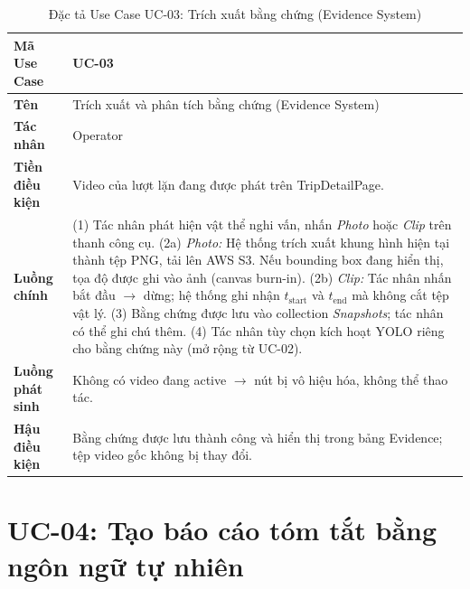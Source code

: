 \documentclass[../DoAn.tex]{subfiles}
\begin{document}
\begin{longtable}{|p{3.5cm}|p{10.0cm}|}
\caption{Đặc tả Use Case UC-03: Trích xuất bằng chứng (Evidence System)}\label{tab:b-uc03}\\
\hline
\textbf{Mã Use Case} & UC-03 \\
\hline
\textbf{Tên} & Trích xuất và phân tích bằng chứng (Evidence System) \\
\hline
\textbf{Tác nhân} & Operator \\
\hline
\textbf{Tiền điều kiện} & Video của lượt lặn đang được phát trên TripDetailPage. \\
\hline
\textbf{Luồng chính} &
(1) Tác nhân phát hiện vật thể nghi vấn, nhấn \textit{Photo} hoặc \textit{Clip} trên thanh công cụ. \newline
(2a) \textit{Photo:} Hệ thống trích xuất khung hình hiện tại thành tệp PNG, tải lên AWS S3. Nếu bounding box đang hiển thị, tọa độ được ghi vào ảnh (canvas burn-in). \newline
(2b) \textit{Clip:} Tác nhân nhấn bắt đầu $\to$ dừng; hệ thống ghi nhận $t_{\text{start}}$ và $t_{\text{end}}$ mà không cắt tệp vật lý. \newline
(3) Bằng chứng được lưu vào collection \textit{Snapshots}; tác nhân có thể ghi chú thêm. \newline
(4) Tác nhân tùy chọn kích hoạt YOLO riêng cho bằng chứng này (mở rộng từ UC-02). \\
\hline
\textbf{Luồng phát sinh} & Không có video đang active $\to$ nút bị vô hiệu hóa, không thể thao tác. \\
\hline
\textbf{Hậu điều kiện} & Bằng chứng được lưu thành công và hiển thị trong bảng Evidence; tệp video gốc không bị thay đổi. \\
\hline
\end{longtable}

\section{UC-04: Tạo báo cáo tóm tắt bằng ngôn ngữ tự nhiên}
\end{document}
